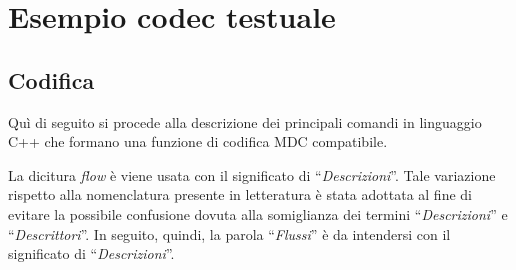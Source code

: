 \chapter{Esempio codec testuale}
\section{Codifica}
Qu\`i di seguito si procede alla descrizione dei principali comandi in linguaggio C++ che formano una funzione di codifica MDC compatibile.

\begin{notabene}
La dicitura \textit{flow} \`e viene usata con il significato di ``\emph{Descrizioni}''. Tale variazione rispetto alla nomenclatura presente in letteratura \`e stata adottata al fine di evitare la possibile confusione dovuta alla somiglianza dei termini ``\emph{Descrizioni}'' e ``\emph{Descrittori}''. In seguito, quindi, la parola ``\emph{Flussi}'' \`e da intendersi con il significato di ``\emph{Descrizioni}''.
\end{notabene}

